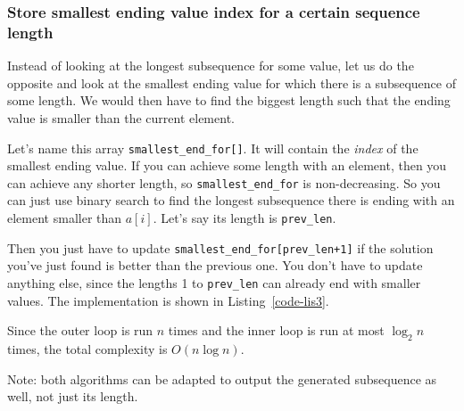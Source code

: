 \subsubsection{Store smallest ending value index for a certain sequence length}
Instead of looking at the longest subsequence for some value,
let us do the opposite
and look at the smallest ending value for which there is a subsequence
of some length.
We would then have to find the biggest length such that the ending value
is smaller than the current element.

Let's name this array \texttt{smallest\_end\_for[]}.
It will contain the \emph{index} of the smallest ending value.
If you can achieve some length with an element, then you can achieve
any shorter length, so \texttt{smallest\_end\_for} is non-decreasing.
So you can just use binary search to find the longest subsequence
there is ending with an element smaller than $a[i]$. Let's say its length is
\texttt{prev\_len}.

Then you just have to update \texttt{smallest\_end\_for[prev\_len+1]}
if the solution you've just found is better than the previous one.
You don't have to update anything else, since the lengths 1 to
\texttt{prev\_len}
can already end with smaller values.
The implementation is shown in Listing~\ref{code-lis3}.



Since the outer loop is run $n$ times and the inner loop is run
at most $\log_2 n$ times, the total complexity is $O(n\log n)$.

Note: both algorithms can be adapted to output the generated
subsequence as well, not just its length.
